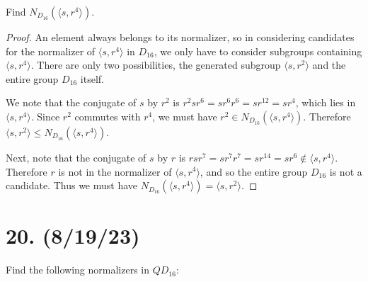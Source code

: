 \documentclass{article}
\begin{document}
Find $N_{D_{16}}(\langle s, r^4 \rangle)$.

\begin{proof}
    An element always belongs to its normalizer, so in considering candidates for the normalizer of $\langle s, r^4 \rangle$ in $D_{16}$, we only have to consider subgroups containing $\langle s, r^4 \rangle$. There are only two possibilities, the generated subgroup $\langle s, r^2 \rangle$ and the entire group $D_{16}$ itself.

    We note that the conjugate of $s$ by $r^2$ is $r^2 s r^6 = s r^6 r^6 = sr^{12} = sr^4$, which lies in $\langle s, r^4 \rangle$. Since $r^2$ commutes with $r^4$, we must have $r^2 \in N_{D_{16}}(\langle s, r^4 \rangle)$. Therefore $\langle s, r^2 \rangle \leq N_{D_{16}}(\langle s, r^4 \rangle)$.

    Next, note that the conjugate of $s$ by $r$ is $r s r^7 = sr^7 r^7 = sr^{14} = sr^6 \notin \langle s, r^4 \rangle$. Therefore $r$ is not in the normalizer of $\langle s, r^4 \rangle$, and so the entire group $D_{16}$ is not a candidate. Thus we must have $N_{D_{16}}(\langle s, r^4 \rangle) = \langle s, r^2 \rangle$.
\end{proof}

\section*{20. (8/19/23)}

Find the following normalizers in $QD_{16}$:
\end{document}
